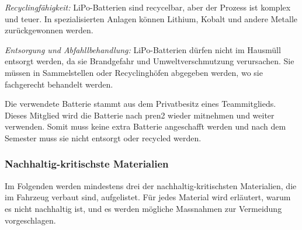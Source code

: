 \textit{Recyclingfähigkeit:} LiPo-Batterien sind recycelbar, aber der Prozess ist komplex und teuer. In spezialisierten Anlagen können Lithium, Kobalt und andere Metalle zurückgewonnen werden.\cite{regan-2023}


\textit{Entsorgung und Abfahllbehandlung:} LiPo-Batterien dürfen nicht im Hausmüll entsorgt
werden, da sie Brandgefahr und Umweltverschmutzung verursachen. Sie müssen in Sammelstellen oder Recyclinghöfen abgegeben werden, wo sie fachgerecht behandelt werden.

Die verwendete Batterie stammt aus dem Privatbesitz eines Teammitglieds. Dieses Mitglied wird die Batterie nach \acrshort{pren2} wieder mitnehmen und weiter verwenden. Somit muss keine extra Batterie angeschafft werden und nach dem Semester muss sie nicht entsorgt oder recycled werden.


\subsubsection{Nachhaltig-kritischste Materialien}
Im Folgenden werden mindestens drei der nachhaltig-kritischsten Materialien, die im Fahrzeug verbaut sind, aufgelistet. Für jedes Material wird erläutert, warum es nicht nachhaltig ist, und es werden mögliche Massnahmen zur Vermeidung vorgeschlagen.

